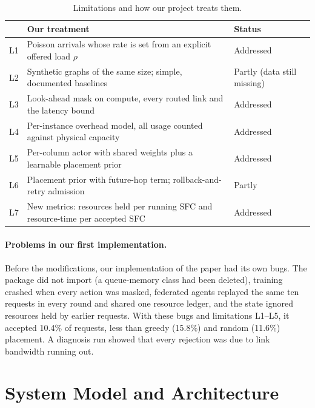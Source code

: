 \documentclass[11pt,a4paper]{article}
\newcommand{\ours}[1]{\textcolor[HTML]{1B7F5A}{#1}}
\begin{document}
\begin{table}[H]
\centering\small
\caption{Limitations and how our project treats them.}
\label{tab:limits}
\begin{tabularx}{\linewidth}{l X l}
\toprule
 & Our treatment & Status \\
\midrule
L1 & Poisson arrivals whose rate is set from an explicit offered load $\rho$ & \ours{Addressed} \\
L2 & Synthetic graphs of the same size; simple, documented baselines & Partly (data still missing) \\
L3 & Look-ahead mask on compute, every routed link and the latency bound & \ours{Addressed} \\
L4 & Per-instance overhead model, all usage counted against physical capacity & \ours{Addressed} \\
L5 & Per-column actor with shared weights plus a learnable placement prior & \ours{Addressed} \\
L6 & Placement prior with future-hop term; rollback-and-retry admission & Partly \\
L7 & New metrics: resources held per running SFC and resource-time per accepted SFC & \ours{Addressed} \\
\bottomrule
\end{tabularx}
\end{table}

\paragraph{Problems in our first implementation.} Before the modifications, our
implementation of the paper had its own bugs. The package did not import (a
queue-memory class had been deleted), training crashed when every action was
masked, federated agents replayed the same ten requests in every round and
shared one resource ledger, and the state ignored resources held by earlier
requests. With these bugs and limitations L1--L5, it accepted
10.4\% of requests, less than greedy (15.8\%) and random (11.6\%) placement. A
diagnosis run showed that every rejection was due to link bandwidth running out.

\section{System Model and Architecture}
\end{document}
